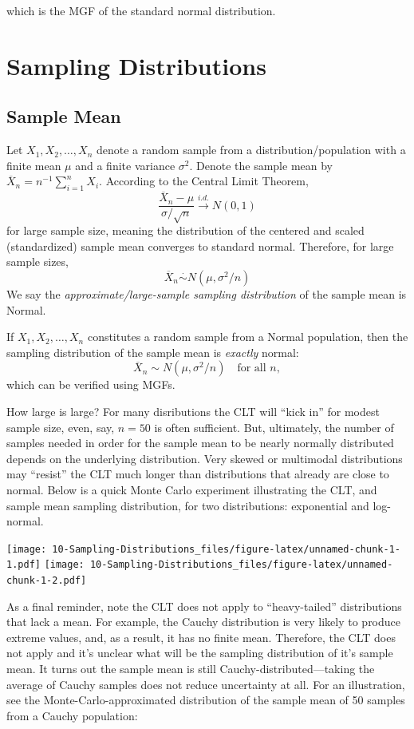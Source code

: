 \documentclass[]{book}
\begin{document}
which is the MGF of the standard normal distribution.

\chapter{Sampling Distributions}\label{sampling-distributions}

\section{Sample Mean}\label{sample-mean}

Let \(X_1, X_2, \ldots, X_n\) denote a random sample from a
distribution/population with a finite mean \(\mu\) and a finite variance
\(\sigma^2\). Denote the sample mean by
\(\overline X_n = n^{-1}\sum_{i=1}^n X_i\). According to the Central
Limit Theorem,
\[\frac{\overline X_n - \mu}{\sigma / \sqrt{n}} \stackrel{i.d.}{\rightarrow} N(0,1)\]
for large sample size, meaning the distribution of the centered and
scaled (standardized) sample mean converges to standard normal.
Therefore, for large sample sizes,
\[\overline X_n \stackrel{\cdot}{\sim} N(\mu, \sigma^2/n)\] We say the
\emph{approximate/large-sample sampling distribution} of the sample mean
is Normal.

If \(X_1, X_2, \ldots, X_n\) constitutes a random sample from a Normal
population, then the sampling distribution of the sample mean is
\emph{exactly} normal:
\[\overline X_n \sim N(\mu, \sigma^2/n)\quad \text{for all }n,\] which
can be verified using MGFs.

How large is large? For many disributions the CLT will ``kick in'' for
modest sample size, even, say, \(n=50\) is often sufficient. But,
ultimately, the number of samples needed in order for the sample mean to
be nearly normally distributed depends on the underlying distribution.
Very skewed or multimodal distributions may ``resist'' the CLT much
longer than distributions that already are close to normal. Below is a
quick Monte Carlo experiment illustrating the CLT, and sample mean
sampling distribution, for two distributions: exponential and
log-normal.

\texttt{[image: 10-Sampling-Distributions\_files/figure-latex/unnamed-chunk-1-1.pdf]}
\texttt{[image: 10-Sampling-Distributions\_files/figure-latex/unnamed-chunk-1-2.pdf]}

As a final reminder, note the CLT does not apply to ``heavy-tailed''
distributions that lack a mean. For example, the Cauchy distribution is
very likely to produce extreme values, and, as a result, it has no
finite mean. Therefore, the CLT does not apply and it's unclear what
will be the sampling distribution of it's sample mean. It turns out the
sample mean is still Cauchy-distributed---taking the average of Cauchy
samples does not reduce uncertainty at all. For an illustration, see the
Monte-Carlo-approximated distribution of the sample mean of 50 samples
from a Cauchy population:
\end{document}
